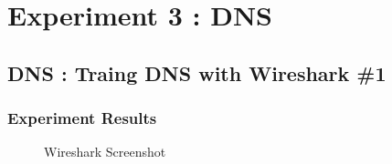 \section{Experiment 3 : DNS}
\subsection{DNS : Traing DNS with Wireshark \#1}
    \subsubsection*{Experiment Results}
         \vspace{-4mm}
    	\begin{figure}[!h]\centering
    		\caption{Wireshark Screenshot}
    	\end{figure}
        \vspace{-4mm}  
